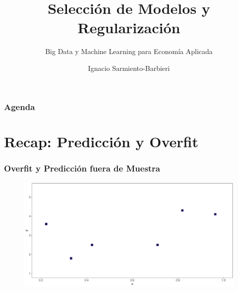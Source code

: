 \documentclass[
  shownotes,
  xcolor={svgnames},
  hyperref={colorlinks,citecolor=DarkBlue,linkcolor=andesred,urlcolor=DarkBlue}
  , aspectratio=169]{beamer}
\begin{document}
\title{Selección de Modelos y Regularización}
\subtitle{Big Data y Machine Learning para Economía Aplicada}
\date{}

\author[Sarmiento-Barbieri]{Ignacio Sarmiento-Barbieri}



\begin{frame}[noframenumbering]
\maketitle
\end{frame}
\begin{frame}
\frametitle{Agenda}

\tableofcontents


\end{frame}
\section{Recap: Predicción y Overfit} 

\begin{frame}
\frametitle{Overfit y Predicción fuera de Muestra}


        \begin{figure}[H] \centering
            \captionsetup{justification=centering}
              \includegraphics[scale=0.4]{figures/fig_1a.pdf}
 \end{figure}


\end{frame}
\end{document}
